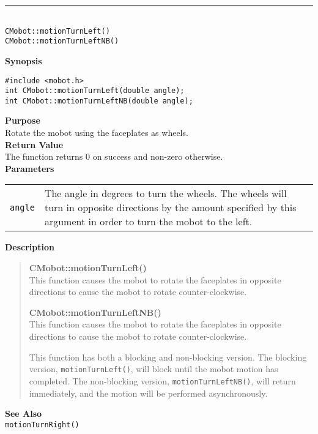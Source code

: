\noindent
\vspace{5pt}
\rule{4.5in}{0.015in}\\
\noindent
{\LARGE \texttt{CMobot::motionTurnLeft()}}\\
{\LARGE \texttt{CMobot::motionTurnLeftNB()}}\\
{}

\noindent
{\bf Synopsis}
\vspace{-8pt}
\begin{verbatim}
#include <mobot.h>
int CMobot::motionTurnLeft(double angle);
int CMobot::motionTurnLeftNB(double angle);
\end{verbatim}

\noindent
{\bf Purpose}\\
Rotate the mobot using the faceplates as wheels.\\

\noindent
{\bf Return Value}\\
The function returns 0 on success and non-zero otherwise.\\

\noindent
{\bf Parameters}\\
\vspace{-0.1in}
\begin{description}
\item               
\begin{tabular}{p{10 mm}p{145 mm}}
\texttt{angle} & The angle in degrees to turn the wheels. The wheels will turn in opposite directions by the amount specified by this argument in order to turn the mobot to the left. \\
\end{tabular}
\end{description}

\noindent
{\bf Description}\\
\vspace{-12pt}
\begin{quote}
{\bf CMobot::motionTurnLeft()}\\
This function causes the mobot to rotate the faceplates in opposite directions
to cause the mobot to rotate counter-clockwise.

{\bf CMobot::motionTurnLeftNB()}\\
This function causes the mobot to rotate the faceplates in opposite directions
to cause the mobot to rotate counter-clockwise.

This function has both a blocking and non-blocking version.
The blocking version, \texttt{motionTurnLeft()}, will block until the
mobot motion has completed. The non-blocking version, \texttt{motionTurnLeftNB()},
will return immediately, and the motion will be performed asynchronously.\\
\end{quote}


\noindent
{\bf See Also}\\
\texttt{motionTurnRight()}

